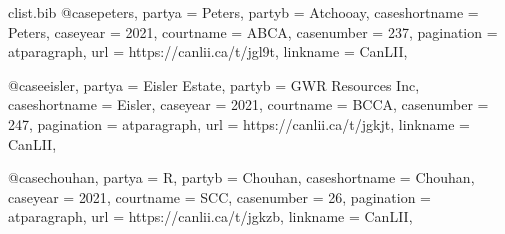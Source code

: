\begin{filecontents*}[overwrite]{clist\jobname.bib}
@case{peters,	partya =  {Peters},	partyb =  {Atchooay},	caseshortname =  {Peters},	caseyear =  {2021},	courtname =  {ABCA},	casenumber =  {237},	pagination =  {atparagraph},						url =  {https://canlii.ca/t/jgl9t},	linkname =  {CanLII},									}

@case{eisler,	partya =  {Eisler Estate},	partyb =  {GWR Resources Inc},	caseshortname =  {Eisler},	caseyear =  {2021},	courtname =  {BCCA},	casenumber =  {247},	pagination =  {atparagraph},						url =  {https://canlii.ca/t/jgkjt},	linkname =  {CanLII},									}


@case{chouhan,	partya =  {R},	partyb =  {Chouhan},	caseshortname =  {Chouhan},	caseyear =  {2021},	courtname =  {SCC},	casenumber =  {26},	pagination =  {atparagraph},						url =  {https://canlii.ca/t/jgkzb},	linkname =  {CanLII},									}

\end{filecontents*}


